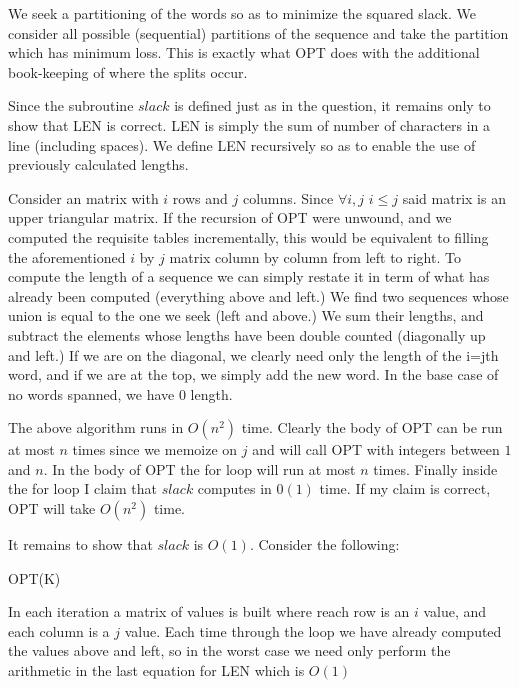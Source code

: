 \documentclass{amsart}
\theoremstyle{definition}
\theoremstyle{remark}
\numberwithin{equation}{section}
\begin{document}
We seek a partitioning of the words so as to minimize the squared slack. We consider all possible (sequential) partitions of the sequence and take the partition which has minimum loss. This is exactly what OPT does with the additional book-keeping of where the splits occur.

Since the subroutine $slack$ is defined just as in the question, it remains only to show that LEN is correct. LEN is simply the sum of number of characters in a line (including spaces). We define LEN recursively so as to enable the use of previously calculated lengths.

Consider an matrix with $i$ rows and $j$ columns. Since $\forall i,j$ $i\leq j$ said matrix is an upper triangular matrix. If the recursion of OPT were unwound, and we computed the requisite tables incrementally, this would be equivalent to filling the aforementioned $i$ by $j$ matrix column by column from left to right. To compute the length of a sequence we can simply restate it in term of what has already been computed (everything above and left.) We find two sequences whose union is equal to the one we seek (left and above.) We sum their lengths, and subtract the elements whose lengths have been double counted (diagonally up and left.) If we are on the diagonal, we clearly need only the length of the i=jth word, and if we are at the top, we simply add the new word. In the base case of no words spanned, we have 0 length.

\claimstar The above algorithm runs in $O(n^2)$ time.
Clearly the body of OPT can be run at most $n$ times since we memoize on $j$ and will call OPT with integers between $1$ and $n$. In the body of OPT the for loop will run at most $n$ times. Finally inside the for loop I claim that $slack$ computes in $0(1)$ time. If my claim is correct, OPT will take $O(n^2)$ time.

It remains to show that $slack$ is $O(1)$. Consider the following:

\begin{algorithm}

    OPT(K)
  \EndFor
\end{algorithm}

In each iteration a matrix of values is built where reach row is an $i$ value, and each column is a $j$ value. Each time through the loop we have already computed the values above and left, so in the worst case we need only perform the arithmetic in the last equation for LEN which is $O(1)$
\end{document}
